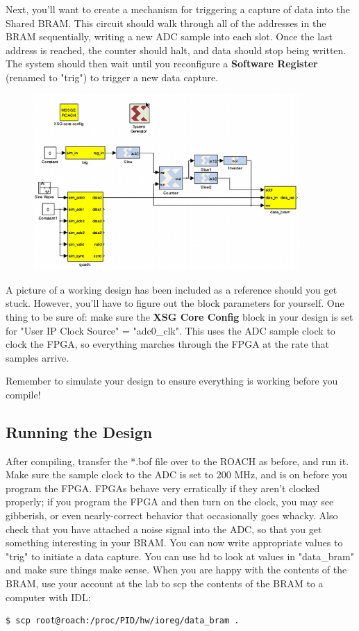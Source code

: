 \documentclass[11pt]{article}
\begin{document}
Next, you'll want to
create a mechanism for triggering a capture of data into the Shared BRAM.  This circuit should walk
through all of the addresses in the BRAM sequentially, writing a new ADC sample into each slot.  
Once the last address is reached, the counter should halt, and data should stop being written.  The
system should then wait until you reconfigure a {\bf Software Register} (renamed to "trig") to
trigger a new data capture.

\begin{figure}
\includegraphics[width=4in]{adc_capture.png}
\end{figure}

A picture of a working design has been included as a reference should you get stuck.  However, you'll
have to figure out the block parameters for yourself.  One thing to be sure of: make sure the {\bf XSG Core Config}
block in your design is set for "User IP Clock Source" = "adc0\_clk".  This uses the ADC sample clock 
to clock the FPGA, so everything marches through the FPGA at the rate that samples arrive.

Remember to simulate your design to ensure everything is working before you compile!

\subsection{Running the Design}

After compiling, transfer the *.bof file over to the ROACH as before, and run it.  Make sure the sample clock
to the ADC is set to 200 MHz, and is on before you program the FPGA.  FPGAs behave very erratically if they aren't
clocked properly; if you program the FPGA and then turn on the clock, you may see gibberish, or even nearly-correct
behavior that occasionally goes whacky.  Also check that you have attached a 
noise signal into the ADC, so that you get something interesting in your BRAM.  You can now write appropriate 
values to "trig" to initiate a data capture.  You can use hd to look at values in "data\_bram" and make sure things
make sense.  When you are happy with the contents of the BRAM, use your account at the lab to scp the contents of the
BRAM to a computer with IDL:
\begin{verbatim}
$ scp root@roach:/proc/PID/hw/ioreg/data_bram .
\end{verbatim}
\end{document}
